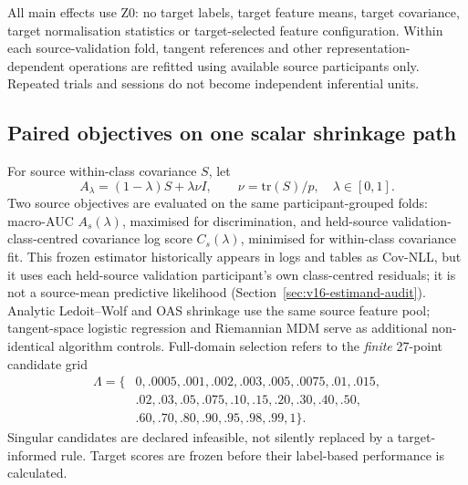\documentclass[11pt,a4paper]{article}
\begin{document}
All main effects use Z0: no target labels, target feature means, target
covariance, target normalisation statistics or target-selected feature
configuration. Within each source-validation fold, tangent references and
other representation-dependent operations are refitted using available
source participants only. Repeated trials and sessions do not become
independent inferential units.

\subsection{Paired objectives on one scalar shrinkage path}
For source within-class covariance \(S\), let
\[
 A_\lambda=(1-\lambda)S+\lambda\nu I,\qquad
 \nu=\mathrm{tr}(S)/p,\quad \lambda\in[0,1].
\]
Two source objectives are evaluated on the same participant-grouped folds:
macro-AUC \(A_s(\lambda)\), maximised for discrimination, and held-source validation-class-centred covariance log score
\(C_s(\lambda)\), minimised for within-class covariance fit.
This frozen estimator historically appears in logs and tables as
Cov-NLL, but it uses each held-source validation participant's own
class-centred residuals; it is not a source-mean predictive likelihood
(Section~\ref{sec:v16-estimand-audit}). Analytic Ledoit--Wolf and OAS shrinkage use the same
source feature pool; tangent-space logistic regression and Riemannian
MDM serve as additional non-identical algorithm controls. Full-domain
selection refers to the \emph{finite} 27-point candidate grid
\[
\begin{aligned}
\Lambda=\{&0,.0005,.001,.002,.003,.005,.0075,.01,.015,\\
&.02,.03,.05,.075,.10,.15,.20,.30,.40,.50,\\
&.60,.70,.80,.90,.95,.98,.99,1\}.
\end{aligned}
\]
Singular candidates are declared infeasible, not silently replaced by
a target-informed rule. Target scores are frozen before their
label-based performance is calculated.





\end{document}
